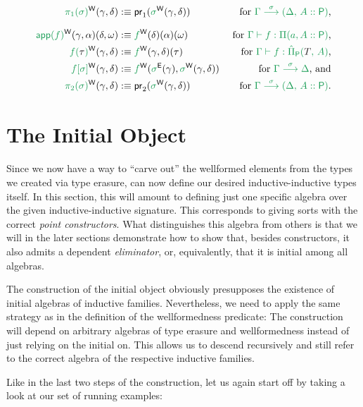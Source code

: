 \begin{defn}
\begin{defn}
\begin{align*}
\grm{\pi_1(\sigma)}^\WW(\gamma, \delta)
  &:\equiv \pr_1(\grm{\sigma}^\WW(\gamma, \delta))
  & \text{ for \grm{\IISub{\sigma}{\Gamma}{(\Delta,\,A :: \Pc)}},} \\[.7em]
\grm{\IIapp(f)}^\WW(\gamma, \alpha)(\delta, \omega)
  &:\equiv \grm{f}^\WW(\delta)(\alpha)(\omega)
  & \text{ for \grm{\Gamma \vdash f : \Pi(a, A :: \Pc)},} \\
\grm{f(\bltau)}^\WW(\gamma, \delta)
  &:\equiv \grm{f}^\WW(\gamma, \delta)(\tau)
  & \text{ for \grm{\Gamma \vdash f : \ExtPiP{T}{A}},} \\
\grm{f[\sigma]}^\WW(\gamma, \delta)
  &:\equiv \grm{f}^\WW(\grm{\sigma}^\EE(\gamma), \grm{\sigma}^\WW(\gamma, \delta))
  & \text{ for \grm{\IISub{\sigma}{\Gamma}{\Delta}}, and} \\
\grm{\pi_2(\sigma)}^\WW(\gamma, \delta)
  &:\equiv \pr_2(\grm{\sigma}^\WW(\gamma, \delta))
  & \text{ for \grm{\IISub{\sigma}{\Gamma}{(\Delta,\,A :: \Pc)}}.}
\end{align*}
\end{defn}

\section{The Initial Object}

Since we now have a way to ``carve out'' the wellformed elements from the types
we created via type erasure, can now define our desired inductive-inductive types
itself.
In this section, this will amount to defining just one specific algebra over the
given inductive-inductive signature.
This corresponds to giving sorts with the correct \emph{point constructors}.
What distinguishes this algebra from others is that we will in the later sections
demonstrate how to show that, besides constructors, it also admits a dependent
\emph{eliminator}, or, equivalently, that it is initial among all algebras.

The construction of the initial object obviously presupposes the existence of
initial algebras of inductive families.
Nevertheless, we need to apply the same strategy as in the definition of the
wellformedness predicate:
The construction will depend on arbitrary algebras of type erasure and wellformedness
instead of just relying on the initial on.
This allows us to descend recursively and still refer to the correct algebra
of the respective inductive families.

Like in the last two steps of the construction, let us again start off by taking
a look at our set of running examples:


\end{defn}

